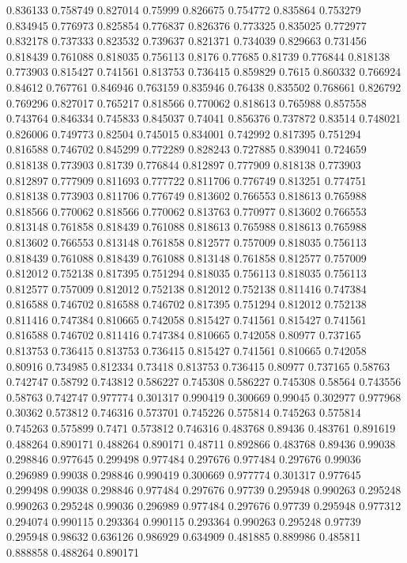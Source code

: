0.836133 0.758749
0.827014 0.75999
0.826675 0.754772
0.835864 0.753279
0.834945 0.776973
0.825854 0.776837
0.826376 0.773325
0.835025 0.772977
0.832178 0.737333
0.823532 0.739637
0.821371 0.734039
0.829663 0.731456
0.818439 0.761088
0.818035 0.756113
0.8176 0.77685
0.81739 0.776844
0.818138 0.773903
0.815427 0.741561
0.813753 0.736415
0.859829 0.7615
0.860332 0.766924
0.84612 0.767761
0.846946 0.763159
0.835946 0.76438
0.835502 0.768661
0.826792 0.769296
0.827017 0.765217
0.818566 0.770062
0.818613 0.765988
0.857558 0.743764
0.846334 0.745833
0.845037 0.74041
0.856376 0.737872
0.83514 0.748021
0.826006 0.749773
0.82504 0.745015
0.834001 0.742992
0.817395 0.751294
0.816588 0.746702
0.845299 0.772289
0.828243 0.727885
0.839041 0.724659
0.818138 0.773903
0.81739 0.776844
0.812897 0.777909
0.818138 0.773903
0.812897 0.777909
0.811693 0.777722
0.811706 0.776749
0.813251 0.774751
0.818138 0.773903
0.811706 0.776749
0.813602 0.766553
0.818613 0.765988
0.818566 0.770062
0.818566 0.770062
0.813763 0.770977
0.813602 0.766553
0.813148 0.761858
0.818439 0.761088
0.818613 0.765988
0.818613 0.765988
0.813602 0.766553
0.813148 0.761858
0.812577 0.757009
0.818035 0.756113
0.818439 0.761088
0.818439 0.761088
0.813148 0.761858
0.812577 0.757009
0.812012 0.752138
0.817395 0.751294
0.818035 0.756113
0.818035 0.756113
0.812577 0.757009
0.812012 0.752138
0.812012 0.752138
0.811416 0.747384
0.816588 0.746702
0.816588 0.746702
0.817395 0.751294
0.812012 0.752138
0.811416 0.747384
0.810665 0.742058
0.815427 0.741561
0.815427 0.741561
0.816588 0.746702
0.811416 0.747384
0.810665 0.742058
0.80977 0.737165
0.813753 0.736415
0.813753 0.736415
0.815427 0.741561
0.810665 0.742058
0.80916 0.734985
0.812334 0.73418
0.813753 0.736415
0.80977 0.737165
0.58763 0.742747
0.58792 0.743812
0.586227 0.745308
0.586227 0.745308
0.58564 0.743556
0.58763 0.742747
0.977774 0.301317
0.990419 0.300669
0.99045 0.302977
0.977968 0.30362
0.573812 0.746316
0.573701 0.745226
0.575814 0.745263
0.575814 0.745263
0.575899 0.7471
0.573812 0.746316
0.483768 0.89436
0.483761 0.891619
0.488264 0.890171
0.488264 0.890171
0.48711 0.892866
0.483768 0.89436
0.99038 0.298846
0.977645 0.299498
0.977484 0.297676
0.977484 0.297676
0.99036 0.296989
0.99038 0.298846
0.990419 0.300669
0.977774 0.301317
0.977645 0.299498
0.99038 0.298846
0.977484 0.297676
0.97739 0.295948
0.990263 0.295248
0.990263 0.295248
0.99036 0.296989
0.977484 0.297676
0.97739 0.295948
0.977312 0.294074
0.990115 0.293364
0.990115 0.293364
0.990263 0.295248
0.97739 0.295948
0.98632 0.636126
0.986929 0.634909
0.481885 0.889986
0.485811 0.888858
0.488264 0.890171
